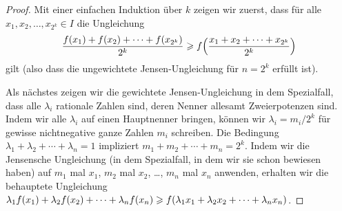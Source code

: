 \begin{proof}
	Mit einer einfachen Induktion über $k$ zeigen wir zuerst, dass für alle $x_1,x_2,\dotsc,x_{2^k}\in I$ die Ungleichung
	\begin{equation*}
		\frac{f(x_1)+f(x_2)+\dotsb+f(x_{2^k})}{2^k}\geqslant f\parens*{\frac{x_1+x_2+\dotsb+x_{2^k}}{2^k}}
	\end{equation*}
	gilt (also dass die ungewichtete Jensen-Ungleichung für $n=2^k$ erfüllt ist).
	
	Als nächstes zeigen wir die gewichtete Jensen-Ungleichung in dem Spezialfall, dass alle $\lambda_i$ rationale Zahlen sind, deren Nenner allesamt Zweierpotenzen sind. Indem wir alle $\lambda_i$ auf einen Hauptnenner bringen, können wir $\lambda_i=m_i/2^k$ für gewisse nichtnegative ganze Zahlen $m_i$ schreiben. Die Bedingung $\lambda_1+\lambda_2+\dotsb+\lambda_n=1$ impliziert $m_1+m_2+\dotsb+m_n=2^k$. Indem wir die Jensensche Ungleichung (in dem Spezialfall, in dem wir sie schon bewiesen haben) auf $m_1$ mal $x_1$, $m_2$ mal $x_2$, \ldots, $m_n$ mal $x_n$ anwenden, erhalten wir die behauptete Ungleichung $\lambda_1f(x_1)+\lambda_2f(x_2)+\dotsb+\lambda_nf(x_n)\geqslant f\parens*{\lambda_1x_1+\lambda_2 x_2+\dotsb+\lambda_nx_n}$.
	

\end{proof}
